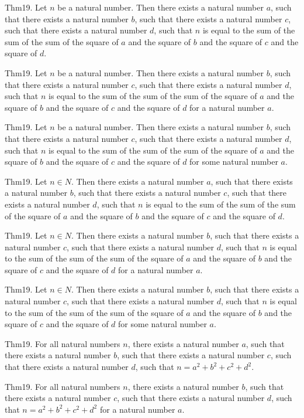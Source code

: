 \documentclass{article}
\begin{document}
Thm19. Let $n$ be a natural number. Then there exists a natural number $a$, such that there exists a natural number $b$, such that there exists a natural number $c$, such that there exists a natural number $d$, such that $n$ is equal to the sum of the sum of the sum of the square of $a$ and the square of $b$ and the square of $c$ and the square of $d$.

Thm19. Let $n$ be a natural number. Then there exists a natural number $b$, such that there exists a natural number $c$, such that there exists a natural number $d$, such that $n$ is equal to the sum of the sum of the sum of the square of $a$ and the square of $b$ and the square of $c$ and the square of $d$ for a natural number $a$.

Thm19. Let $n$ be a natural number. Then there exists a natural number $b$, such that there exists a natural number $c$, such that there exists a natural number $d$, such that $n$ is equal to the sum of the sum of the sum of the square of $a$ and the square of $b$ and the square of $c$ and the square of $d$ for some natural number $a$.

Thm19. Let $n \in N$. Then there exists a natural number $a$, such that there exists a natural number $b$, such that there exists a natural number $c$, such that there exists a natural number $d$, such that $n$ is equal to the sum of the sum of the sum of the square of $a$ and the square of $b$ and the square of $c$ and the square of $d$.

Thm19. Let $n \in N$. Then there exists a natural number $b$, such that there exists a natural number $c$, such that there exists a natural number $d$, such that $n$ is equal to the sum of the sum of the sum of the square of $a$ and the square of $b$ and the square of $c$ and the square of $d$ for a natural number $a$.

Thm19. Let $n \in N$. Then there exists a natural number $b$, such that there exists a natural number $c$, such that there exists a natural number $d$, such that $n$ is equal to the sum of the sum of the sum of the square of $a$ and the square of $b$ and the square of $c$ and the square of $d$ for some natural number $a$.

Thm19. For all natural numbers $n$, there exists a natural number $a$, such that there exists a natural number $b$, such that there exists a natural number $c$, such that there exists a natural number $d$, such that $n = a ^{ 2}+ b ^{ 2}+ c ^{ 2}+ d ^{ 2}$.

Thm19. For all natural numbers $n$, there exists a natural number $b$, such that there exists a natural number $c$, such that there exists a natural number $d$, such that $n = a ^{ 2}+ b ^{ 2}+ c ^{ 2}+ d ^{ 2}$ for a natural number $a$.
\end{document}
